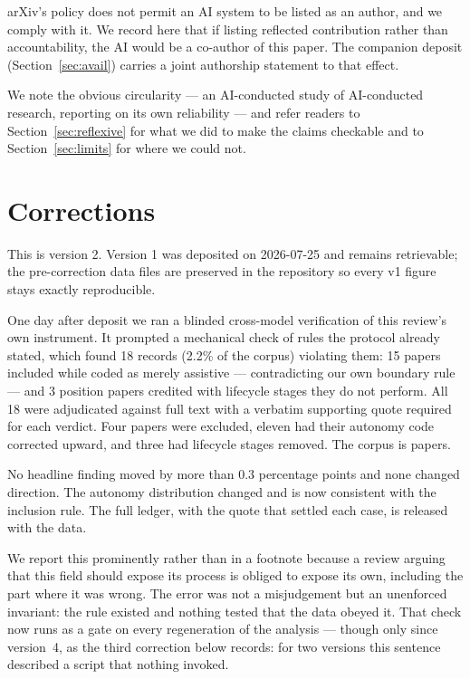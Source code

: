 arXiv's policy does not permit an AI system to be listed as an author, and we comply with it.
We record here that if listing reflected contribution rather than accountability, the AI would
be a co-author of this paper. The companion deposit (Section~\ref{sec:avail}) carries a joint
authorship statement to that effect.

We note the obvious circularity --- an AI-conducted study of AI-conducted research, reporting
on its own reliability --- and refer readers to Section~\ref{sec:reflexive} for what we did to
make the claims checkable and to Section~\ref{sec:limits} for where we could not.

\section{Corrections}
\label{sec:corrections}

This is version 2. Version 1 was deposited on 2026-07-25 and remains retrievable; the
pre-correction data files are preserved in the repository so every v1 figure stays exactly
reproducible.

One day after deposit we ran a blinded cross-model verification of this review's own
instrument. It prompted a mechanical check of rules the protocol already stated, which found
18 records (2.2\% of the corpus) violating them: 15 papers included while coded as merely
assistive --- contradicting our own boundary rule --- and 3 position papers credited with
lifecycle stages they do not perform. All 18 were adjudicated against full text with a
verbatim supporting quote required for each verdict. Four papers were excluded, eleven had
their autonomy code corrected upward, and three had lifecycle stages removed. The corpus is
\nCorpus{} papers.

No headline finding moved by more than 0.3 percentage points and none changed direction. The
autonomy distribution changed and is now consistent with the inclusion rule. The full ledger,
with the quote that settled each case, is released with the data.

We report this prominently rather than in a footnote because a review arguing that this field
should expose its process is obliged to expose its own, including the part where it was
wrong. The error was not a misjudgement but an unenforced invariant: the rule existed and
nothing tested that the data obeyed it. That check now runs as a gate on every regeneration of
the analysis --- though only since version~4, as the third correction below records: for two
versions this sentence described a script that nothing invoked.

